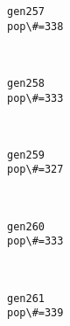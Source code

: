 \documentclass[11pt]{article}
\begin{document}
    \begin{Verbatim}[commandchars=\\\{\}]
gen257
pop\#=338

    \end{Verbatim}

    \begin{center}
    \end{center}
    { \hspace*{\fill} \\}
    
    \begin{Verbatim}[commandchars=\\\{\}]
gen258
pop\#=333

    \end{Verbatim}

    \begin{center}
    \end{center}
    { \hspace*{\fill} \\}
    
    \begin{Verbatim}[commandchars=\\\{\}]
gen259
pop\#=327

    \end{Verbatim}

    \begin{center}
    \end{center}
    { \hspace*{\fill} \\}
    
    \begin{Verbatim}[commandchars=\\\{\}]
gen260
pop\#=333

    \end{Verbatim}

    \begin{center}
    \end{center}
    { \hspace*{\fill} \\}
    
    \begin{Verbatim}[commandchars=\\\{\}]
gen261
pop\#=339

    \end{Verbatim}
\end{document}
